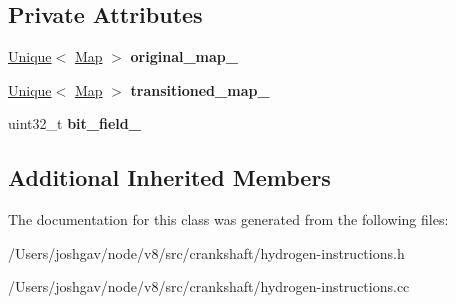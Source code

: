 \subsection*{Private Attributes}
\begin{DoxyCompactItemize}
\item 
\hyperlink{classv8_1_1internal_1_1_unique}{Unique}$<$ \hyperlink{classv8_1_1internal_1_1_map}{Map} $>$ {\bfseries original\+\_\+map\+\_\+}\hypertarget{classv8_1_1internal_1_1_h_transition_elements_kind_aaaa81605f10c196151729e72979cb757}{}\label{classv8_1_1internal_1_1_h_transition_elements_kind_aaaa81605f10c196151729e72979cb757}

\item 
\hyperlink{classv8_1_1internal_1_1_unique}{Unique}$<$ \hyperlink{classv8_1_1internal_1_1_map}{Map} $>$ {\bfseries transitioned\+\_\+map\+\_\+}\hypertarget{classv8_1_1internal_1_1_h_transition_elements_kind_ab53702adf0aa29a7f9636ffcb963d789}{}\label{classv8_1_1internal_1_1_h_transition_elements_kind_ab53702adf0aa29a7f9636ffcb963d789}

\item 
uint32\+\_\+t {\bfseries bit\+\_\+field\+\_\+}\hypertarget{classv8_1_1internal_1_1_h_transition_elements_kind_a57670a804f959c513021333745628d62}{}\label{classv8_1_1internal_1_1_h_transition_elements_kind_a57670a804f959c513021333745628d62}

\end{DoxyCompactItemize}
\subsection*{Additional Inherited Members}


The documentation for this class was generated from the following files\+:\begin{DoxyCompactItemize}
\item 
/\+Users/joshgav/node/v8/src/crankshaft/hydrogen-\/instructions.\+h\item 
/\+Users/joshgav/node/v8/src/crankshaft/hydrogen-\/instructions.\+cc\end{DoxyCompactItemize}
